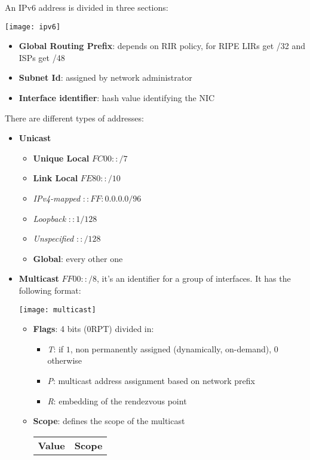 An IPv6 address is divided in three sections:
\begin{center}
	\texttt{[image: ipv6]}
\end{center}
\begin{itemize}
	\item \textbf{Global Routing Prefix}: depends on RIR policy, for RIPE LIRs get /32 and ISPs get /48
	\item \textbf{Subnet Id}: assigned by network administrator
	\item \textbf{Interface identifier}: hash value identifying the NIC
\end{itemize}
\newpage
\noindent There are different types of addresses:
\begin{itemize}
	\item \textbf{Unicast}
	\begin{itemize}
		\item \textbf{Unique Local} $FC00::/7$
		\item \textbf{Link Local} $FE80::/10$
		\item \textit{IPv4-mapped} $::FF:0.0.0.0/96$
		\item \textit{Loopback} $::1/128$
		\item \textit{Unspecified} $::/128$
		\item \textbf{Global}: every other one
	\end{itemize}
	\item \textbf{Multicast} $FF00::/8$, it's an identifier for a group of interfaces. It has the following format:
	\begin{center}
		\texttt{[image: multicast]}
	\end{center}
	\begin{itemize}
		\item \textbf{Flags}: 4 bits (0RPT) divided in:
		\begin{itemize}
			\item \textit{T}: if $1$, non permanently assigned (dynamically, on-demand), $0$ otherwise
			\item \textit{P}: multicast address assignment based on network prefix
			\item \textit{R}: embedding of the rendezvous point
		\end{itemize}
		\item \textbf{Scope}: defines the scope of the multicast
		\begin{table}[!h]
			\centering
			\begin{tabular}{c|c}
				\textbf{Value} & \textbf{Scope} \\

\end{tabular}
\end{table}
\end{itemize}
\end{itemize}
